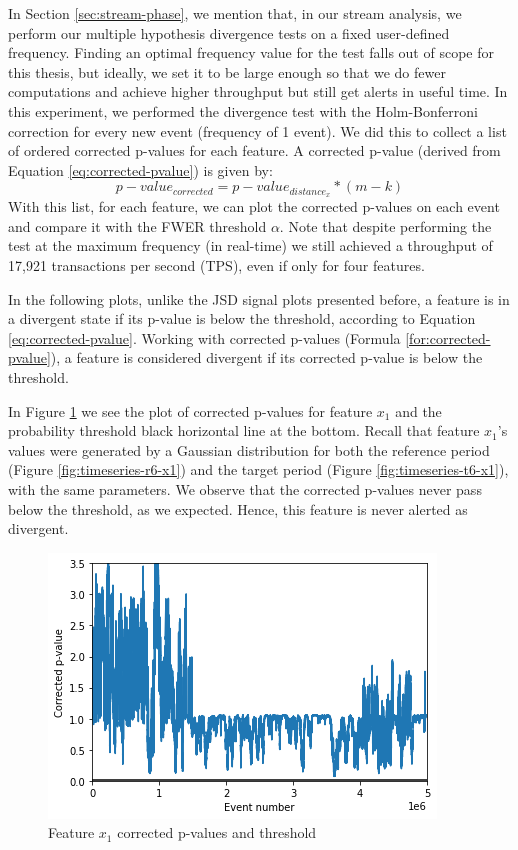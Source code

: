 \documentclass[sigconf]{acmart}
\begin{document}
In Section \ref{sec:stream-phase}, we mention that, in our stream analysis, we perform our multiple hypothesis divergence tests on a fixed user-defined frequency. Finding an optimal frequency value for the test falls out of scope for this thesis, but ideally, we set it to be large enough so that we do fewer computations and achieve higher throughput but still get alerts in useful time. In this experiment, we performed the divergence test with the Holm-Bonferroni correction for every new event (frequency of 1 event). We did this to collect a list of ordered corrected p-values for each feature. A corrected p-value (derived from Equation \ref{eq:corrected-pvalue}) is given by:
\begin{equation}
    p-value_{corrected} = p-value_{distance_{x}} * (m - k)
    \label{for:corrected-pvalue}
\end{equation}
With this list, for each feature, we can plot the corrected p-values on each event and compare it with the FWER threshold $\alpha$. Note that despite performing the test at the maximum frequency (in real-time) we still achieved a throughput of 17,921 transactions per second (TPS), even if only for four features.

In the following plots, unlike the JSD signal plots presented before, a feature is in a divergent state if its p-value is below the threshold, according to Equation \ref{eq:corrected-pvalue}. Working with corrected p-values (Formula \ref{for:corrected-pvalue}), a feature is considered divergent if its corrected p-value is below the threshold.

In Figure \ref{fig:x1-corrected-pvalues} we see the plot of corrected p-values for feature $x_1$ and the probability threshold black horizontal line at the bottom. Recall that feature $x_1$'s values were generated by a Gaussian distribution for both the reference period (Figure \ref{fig:timeseries-r6-x1}) and the target period (Figure \ref{fig:timeseries-t6-x1}), with the same parameters. We observe that the corrected p-values never pass below the threshold, as we expected. Hence, this feature is never alerted as divergent.
\begin{figure}[!htb]
    \begin{center}
      \includegraphics[scale=0.5]{figures/x1-corrected-pvalues.png}
      \caption{Feature $x_1$ corrected p-values and threshold}
      \label{fig:x1-corrected-pvalues}
    \end{center}
\end{figure}
\end{document}
